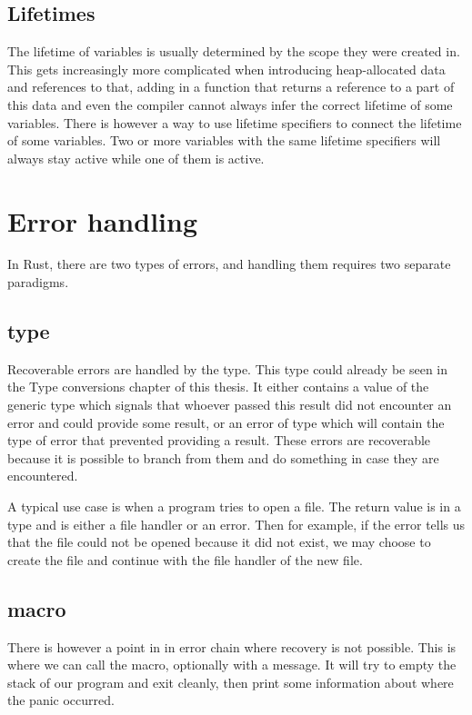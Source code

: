 \subsection{Lifetimes}

The lifetime of variables is usually determined by the scope they were created in. This gets increasingly more complicated when introducing heap-allocated data and references to that, adding in a function that returns a reference to a part of this data and even the compiler cannot always infer the correct lifetime of some variables. There is however a way to use lifetime specifiers to connect the lifetime of some variables. Two or more variables with the same lifetime specifiers will always stay active while one of them is active.

\section{Error handling}

In Rust, there are two types of errors, and handling them requires two separate paradigms.

\subsection{ type}

Recoverable errors are handled by the  type. This type could already be seen in the Type conversions chapter of this thesis. It either contains a value of the generic  type which signals that whoever passed this result did not encounter an error and could provide some result, or an error of type  which will contain the type of error that prevented providing a result. These errors are recoverable because it is possible to branch from them and do something in case they are encountered.

A typical use case is when a program tries to open a file. The return value is in a  type and is either a file handler or an error. Then for example, if the error tells us that the file could not be opened because it did not exist, we may choose to create the file and continue with the file handler of the new file.

\subsection{ macro}

There is however a point in in error chain where recovery is not possible. This is where we can call the  macro, optionally with a message. It will try to empty the stack of our program and exit cleanly, then print some information about where the panic occurred.

